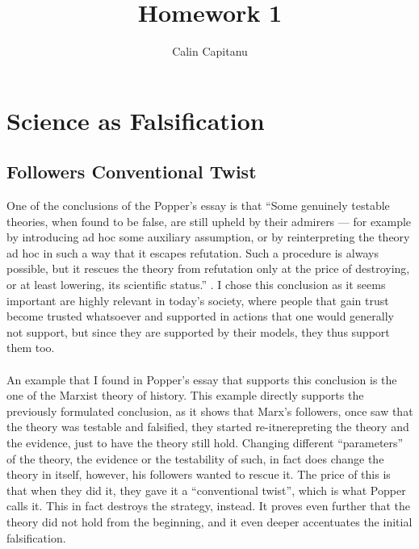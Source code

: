 \documentclass[english]{report}
\begin{document}
\title{Homework 1}
\author{Calin Capitanu}

\maketitle

\clearpage
\chapter{Science as Falsification}

\section{Followers Conventional Twist}
One of the conclusions of the Popper's essay is that ``Some genuinely testable theories, when found to be false, are still upheld by their admirers — for example by introducing
ad hoc some auxiliary assumption, or by reinterpreting the theory ad hoc in such a way that it escapes refutation. Such a
procedure is always possible, but it rescues the theory from refutation only at the price of destroying, or at least lowering, its
scientific status.'' \cite{popper}. I chose this conclusion as it seems important are highly relevant in today's society, where people that gain trust become trusted whatsoever and supported in actions that one would generally not support, but since they are supported by their models, they thus support them too.
\\\\
An example that I found in Popper's essay that supports this conclusion is the one of the Marxist theory of history. This example directly supports the previously formulated conclusion, as it shows that Marx's followers, once saw that the theory was testable and falsified, they started re-itnerepreting the theory and the evidence, just to have the theory still hold. Changing different ``parameters'' of the theory, the evidence or the testability of such, in fact does change the theory in itself, however, his followers wanted to rescue it. The price of this is that when they did it, they gave it a ``conventional twist'', which is what Popper calls it. This in fact destroys the strategy, instead. It proves even further that the theory did not hold from the beginning, and it even deeper accentuates the initial falsification. \cite[p.~3]{popper}
\end{document}
